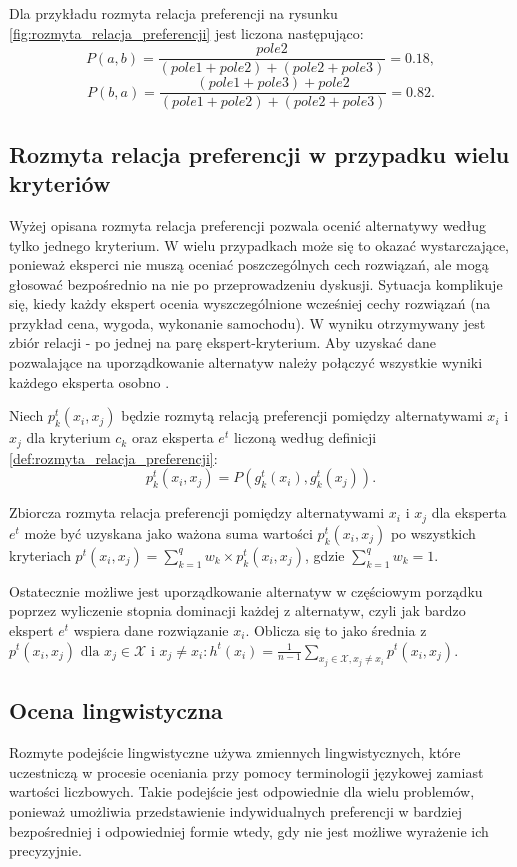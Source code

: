 Dla przykładu rozmyta relacja preferencji na rysunku
\ref{fig:rozmyta_relacja_preferencji} jest liczona następująco:
$$P(a,b) = \frac{pole2}{(pole1 + pole2) + (pole2 + pole3)} = 0.18,$$
$$P(b,a) = \frac{(pole1 + pole3) + pole2}{(pole1 + pole2) + (pole2 + pole3)} =
0.82.$$

\subsection{Rozmyta relacja preferencji w przypadku wielu kryteriów}
Wyżej opisana rozmyta relacja preferencji pozwala ocenić alternatywy według
tylko jednego kryterium. W wielu przypadkach może się to okazać wystarczające,
ponieważ eksperci nie muszą oceniać poszczególnych cech rozwiązań, ale mogą
głosować bezpośrednio na nie po przeprowadzeniu dyskusji. Sytuacja komplikuje
się, kiedy każdy ekspert ocenia wyszczególnione wcześniej cechy rozwiązań (na
przykład cena, wygoda, wykonanie samochodu). W wyniku otrzymywany jest zbiór
relacji - po jednej na parę ekspert-kryterium. Aby uzyskać dane pozwalające na
uporządkowanie alternatyw należy połączyć wszystkie wyniki każdego eksperta
osobno \cite{Li2004}.

Niech $p^t_k(x_i,x_j)$ będzie rozmytą relacją preferencji pomiędzy alternatywami
$x_i$ i $x_j$ dla kryterium $c_k$ oraz eksperta $e^t$ liczoną według definicji
\ref{def:rozmyta_relacja_preferencji}:
$$p^t_k(x_i,x_j) = P(g^t_k(x_i),g^t_k(x_j)).$$

Zbiorcza rozmyta relacja preferencji pomiędzy alternatywami $x_i$ i $x_j$ dla
eksperta $e^t$ może być uzyskana jako ważona suma wartości $p^t_k(x_i,x_j)$ po
wszystkich kryteriach $p^t(x_i,x_j) = \sum_{k=1}^{q} w_k \times p^t_k(x_i,x_j)$,
gdzie $\sum_{k=1}^{q} w_k = 1$.

Ostatecznie możliwe jest uporządkowanie alternatyw w częściowym porządku poprzez
wyliczenie stopnia dominacji każdej z alternatyw, czyli jak bardzo ekspert
$e^t$ wspiera dane rozwiązanie $x_i$. Oblicza się to jako średnia z
$p^t(x_i,x_j) \text{ dla } x_j \in \mathcal{X} \text{ i } x_j \neq x_i \colon
h^t(x_i) = \frac{1}{n-1} \sum_{x_j \in \mathcal{X}, x_j \neq x_i} p^t(x_i,x_j).$

\subsection{Ocena lingwistyczna}
Rozmyte podejście lingwistyczne używa zmiennych lingwistycznych, które
uczestniczą w procesie oceniania przy pomocy terminologii językowej zamiast
wartości liczbowych. Takie podejście jest odpowiednie dla wielu problemów,
ponieważ umożliwia przedstawienie indywidualnych preferencji w bardziej
bezpośredniej i odpowiedniej formie wtedy, gdy nie jest możliwe wyrażenie ich
precyzyjnie.


